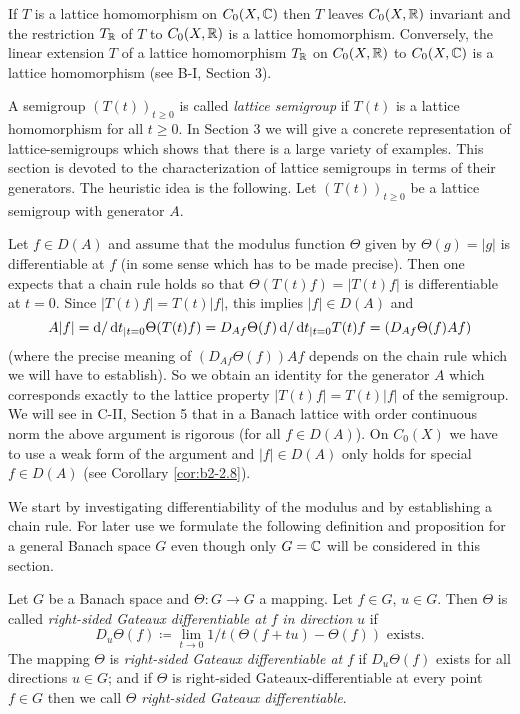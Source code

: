 \begin{remark}\label{rem:b2-2.1}
If $T$ is a lattice homomorphism on $C_{0}(X,\mathbb{C})$ then $T$ leaves $C_{0}(X,\mathbb{R})$ invariant and the restriction $T_{\mathbb{R}}$ of $T$ to $C_{0}(X,\mathbb{R})$ is a lattice homomorphism.
Conversely, the linear extension $T$ of a lattice homomorphism $T_{\mathbb{R}}$ on $C_{0}(X,\mathbb{R})$ to $C_{0}(X,\mathbb{C})$ is a lattice homomorphism (see B-I, Section 3).
\end{remark}

A semigroup $(T(t))_{t \geq 0}$ is called \emph{lattice semigroup} if $T(t)$ is a lattice homomorphism for all $t \geq 0$.
In Section 3 we will give a concrete representation of lattice-semigroups which shows that there is a large variety of examples.
This section is devoted to the characterization of lattice semigroups in terms of their generators.
The heuristic idea is the following.
Let $(T(t))_{t \geq 0}$ be a lattice semigroup with generator $A$.

Let $f \in D(A)$ and assume that the modulus function $\Theta$ given by $\Theta(g) = |g|$ is differentiable at $f$ (in some sense which has to be made precise).
Then one expects that a chain rule holds so that $\Theta(T(t)f) = |T(t)f|$ is differentiable at $t = 0$.
Since $|T(t)f| = T(t)|f|$, this implies $|f| \in D(A)$ and 
\[
A|f| = \mathop{}\!\mathrm{d}{}/\mathop{}\!\mathrm{d}{t}_{|t=0} \Theta(T(t)f) = D_{Af}\Theta(f)\mathop{}\!\mathrm{d}{/}\mathop{}\!\mathrm{d}{t}_{|t=0}T(t)f = (D_{Af}\Theta(f)Af)
\]
 (where the precise meaning of $(D_{Af}\Theta(f))Af$  
 depends on the chain rule which we will have to establish).
So we obtain an identity for the generator $A$ which corresponds exactly to the lattice property $|T(t)f| = T(t)|f|$ of the semigroup.
We will see in C-II, Section  5 that in a Banach lattice with order continuous norm the above argument is rigorous (for all $f \in D(A)$).
On $C_{0}(X)$ we have to use a weak form of the argument and $|f| \in D(A)$ only holds for special $f \in D(A)$ (see Corollary  \ref{cor:b2-2.8}).

We start by investigating differentiability of the modulus and by establishing a chain rule.
For later use we formulate the following definition and proposition for a general Banach space $G$ even though only $G = \mathbb{C}$ will be considered in this section.

\begin{definition}\label{def:b2-2.2}
Let $G$ be a Banach space and $\Theta \colon G \to G$ a mapping.
Let $f \in G$, $u \in G$.
Then $\Theta$ is called \emph{right-sided Gateaux differentiable at} $f$ \emph{in direction} $u$ if
\begin{equation}\label{eq:b2-2.3}
D_{u}\Theta(f) \coloneqq \lim_{t \to 0} 1/t(\Theta(f+tu) - \Theta(f)) \text{ exists.}
\end{equation}
The mapping $\Theta$ is \emph{right-sided Gateaux differentiable at} $f$ if $D_{u}\Theta(f)$ exists for all directions $u \in G$; and if $\Theta$ is right-sided Gateaux-differentiable at every point $f \in G$ then we call $\Theta$ \emph{right-sided Gateaux differentiable}.
\end{definition}

